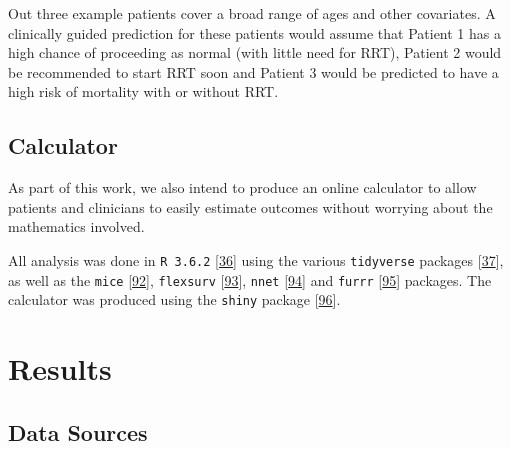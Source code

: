 \documentclass[12pt,PhD,twoside,openright]{muthesis}
\begin{document}
Out three example patients cover a broad range of ages and other covariates. A clinically guided prediction for these patients would assume that Patient 1 has a high chance of proceeding as normal (with little need for RRT), Patient 2 would be recommended to start RRT soon and Patient 3 would be predicted to have a high risk of mortality with or without RRT.

\hypertarget{calculator}{%
\subsection{Calculator}\label{calculator}}

As part of this work, we also intend to produce an online calculator to allow patients and clinicians to easily estimate outcomes without worrying about the mathematics involved.

All analysis was done in \texttt{R\ 3.6.2} {[}\protect\hyperlink{ref-r_core_team_r_nodate}{36}{]} using the various \texttt{tidyverse} packages {[}\protect\hyperlink{ref-wickham_tidy_2017}{37}{]}, as well as the \texttt{mice} {[}\protect\hyperlink{ref-buuren_mice_2011-1}{92}{]}, \texttt{flexsurv} {[}\protect\hyperlink{ref-jackson_flexsurv_nodate}{93}{]}, \texttt{nnet} {[}\protect\hyperlink{ref-ripley_package_2016}{94}{]} and \texttt{furrr} {[}\protect\hyperlink{ref-vaughan_furrr_2018}{95}{]} packages. The calculator was produced using the \texttt{shiny} package {[}\protect\hyperlink{ref-chang_shiny_2020}{96}{]}.

\hypertarget{results-2}{%
\section{Results}\label{results-2}}

\hypertarget{data-sources-1}{%
\subsection{Data Sources}\label{data-sources-1}}
\end{document}
